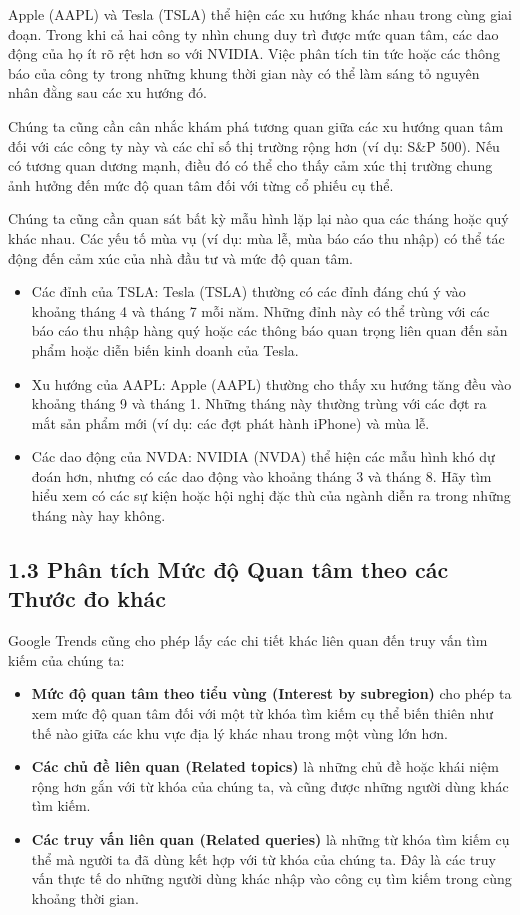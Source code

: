 Apple (AAPL) và Tesla (TSLA) thể hiện các xu hướng khác nhau trong cùng giai đoạn. Trong khi cả hai công ty nhìn chung duy trì được mức quan tâm, các dao động của họ ít rõ rệt hơn so với NVIDIA. Việc phân tích tin tức hoặc các thông báo của công ty trong những khung thời gian này có thể làm sáng tỏ nguyên nhân đằng sau các xu hướng đó.

Chúng ta cũng cần cân nhắc khám phá tương quan giữa các xu hướng quan tâm đối với các công ty này và các chỉ số thị trường rộng hơn (ví dụ: S\&P 500). Nếu có tương quan dương mạnh, điều đó có thể cho thấy cảm xúc thị trường chung ảnh hưởng đến mức độ quan tâm đối với từng cổ phiếu cụ thể.

Chúng ta cũng cần quan sát bất kỳ mẫu hình lặp lại nào qua các tháng hoặc quý khác nhau. Các yếu tố mùa vụ (ví dụ: mùa lễ, mùa báo cáo thu nhập) có thể tác động đến cảm xúc của nhà đầu tư và mức độ quan tâm.

\begin{itemize}
  \item Các đỉnh của TSLA: Tesla (TSLA) thường có các đỉnh đáng chú ý vào khoảng tháng 4 và tháng 7 mỗi năm. Những đỉnh này có thể trùng với các báo cáo thu nhập hàng quý hoặc các thông báo quan trọng liên quan đến sản phẩm hoặc diễn biến kinh doanh của Tesla.
  \item Xu hướng của AAPL: Apple (AAPL) thường cho thấy xu hướng tăng đều vào khoảng tháng 9 và tháng 1. Những tháng này thường trùng với các đợt ra mắt sản phẩm mới (ví dụ: các đợt phát hành iPhone) và mùa lễ.
  \item Các dao động của NVDA: NVIDIA (NVDA) thể hiện các mẫu hình khó dự đoán hơn, nhưng có các dao động vào khoảng tháng 3 và tháng 8. Hãy tìm hiểu xem có các sự kiện hoặc hội nghị đặc thù của ngành diễn ra trong những tháng này hay không.
\end{itemize}

\subsection*{1.3 Phân tích Mức độ Quan tâm theo các Thước đo khác}

Google Trends cũng cho phép lấy các chi tiết khác liên quan đến truy vấn tìm kiếm của chúng ta:

\begin{itemize}
  \item \textbf{Mức độ quan tâm theo tiểu vùng (Interest by subregion)} cho phép ta xem mức độ quan tâm đối với một từ khóa tìm kiếm cụ thể biến thiên như thế nào giữa các khu vực địa lý khác nhau trong một vùng lớn hơn.
  \item \textbf{Các chủ đề liên quan (Related topics)} là những chủ đề hoặc khái niệm rộng hơn gắn với từ khóa của chúng ta, và cũng được những người dùng khác tìm kiếm.
  \item \textbf{Các truy vấn liên quan (Related queries)} là những từ khóa tìm kiếm cụ thể mà người ta đã dùng kết hợp với từ khóa của chúng ta. Đây là các truy vấn thực tế do những người dùng khác nhập vào công cụ tìm kiếm trong cùng khoảng thời gian.
\end{itemize}

